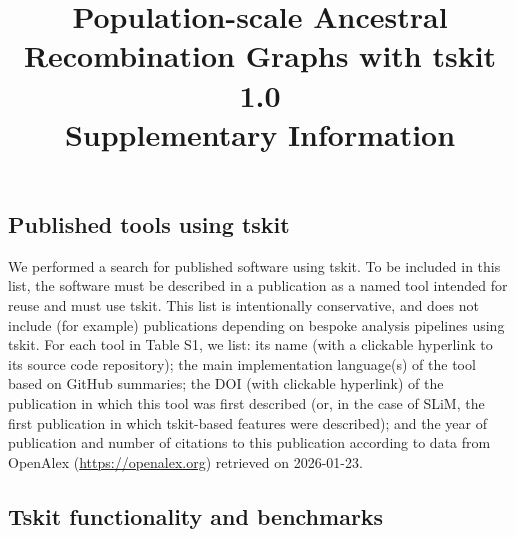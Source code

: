 \documentclass{article}
\begin{document}
\title{Population-scale Ancestral Recombination Graphs with tskit 1.0\\
\large Supplementary Information}



\date{}
\maketitle

\subsection*{Published tools using tskit}
We performed a search for published software using tskit.
To be included in this list, the software must be described in a publication
as a named tool intended for reuse and must use tskit.
This list is intentionally conservative, and does not include
(for example) publications depending on bespoke analysis
pipelines using tskit.
For each tool in Table S1, we list: its name (with a clickable
hyperlink to its source code repository);
the main implementation
language(s) of the tool based on GitHub summaries;
the DOI (with clickable hyperlink) of the publication in which this
tool was first described (or, in the case of SLiM, the first
publication in which tskit-based features were described);
and the year of publication and number of citations to this
publication according to data from OpenAlex
(\url{https://openalex.org}) retrieved on 2026-01-23.



\subsection*{Tskit functionality and benchmarks}
\end{document}
